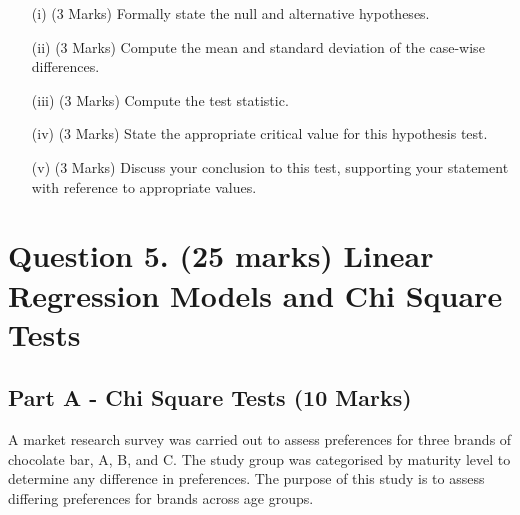 \documentclass[a4paper,12pt]{article}
\begin{document}
\bigskip

\begin{itemize}
	\item[(i)](3 Marks) Formally state the null and alternative hypotheses.
	\item[(ii)] (3 Marks) Compute the mean and standard deviation of the case-wise differences.
	\item[(iii)](3 Marks) Compute the test statistic.
	\item[(iv)](3 Marks) State the appropriate critical value for this hypothesis test.
	\item[(v)](3 Marks) Discuss your conclusion to this test, supporting your statement with reference to appropriate values.
\end{itemize}

%
\newpage

\section*{Question 5. (25 marks) Linear Regression Models and Chi Square Tests }
\subsection*{Part A - Chi Square Tests (10 Marks)}
A market research survey was carried out to assess preferences for three brands of chocolate bar, A, B, and C. 
The study group was categorised by maturity level to determine any difference in preferences. The purpose of this study is to assess differing preferences for brands across age groups.
\end{document}
